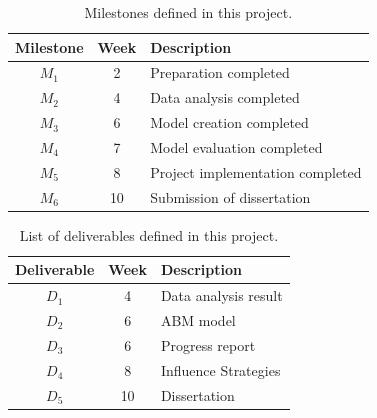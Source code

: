 \documentclass[a4paper,11pt]{article}
\begin{document}
\begin{table}[htbp]
    \begin{center}
        \begin{tabular}{|c|c|l|}
        \hline
        \textbf{Milestone} & \textbf{Week} & \textbf{Description} \\
        \hline
        $M_1$ & 2 & Preparation completed \\
        $M_2$ & 4 & Data analysis completed \\
        $M_3$ & 6 & Model creation completed \\
        $M_4$ & 7 & Model evaluation completed \\
        $M_5$ & 8 & Project implementation completed \\
        $M_6$ & 10 & Submission of dissertation \\
        \hline
        \end{tabular} 
    \end{center}
    \caption{Milestones defined in this project.}
    \label{stones}
\end{table}

\begin{table}[htbp]
    \begin{center}
        \begin{tabular}{|c|c|l|}
        \hline
        \textbf{Deliverable} & \textbf{Week} & \textbf{Description} \\
        \hline
        $D_1$ & 4 & Data analysis result\\
        $D_2$ & 6 & ABM model\\
        $D_3$ & 6 & Progress report \\
        $D_4$ & 8 & Influence Strategies \\
        $D_5$ & 10 & Dissertation \\
        \hline
        \end{tabular} 
    \end{center}
    \caption{List of deliverables defined in this project.}
    \label{del}
\end{table}
\end{document}
